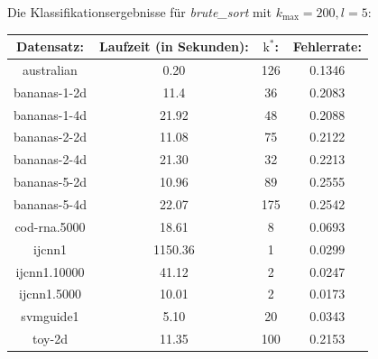 \documentclass[9pt]{beamer}
\begin{document}
\begin{frame}
Die Klassifikationsergebnisse für \textit{brute\_sort} mit $k_\text{max} = 200, l = 5$:
\begin{center}
\begin{tabular}{|c|c|c|c|}
\hline
\textbf{Datensatz:}& \textbf{Laufzeit (in Sekunden):} & \textbf{$\text{k}^*$:} & \textbf{Fehlerrate:}\\

\hline

australian & 0.20 & 126 & 0.1346\\

\hline

bananas-1-2d  &11.4 &36 &0.2083\\

\hline

bananas-1-4d  &21.92 &48 &0.2088\\

\hline

bananas-2-2d  &11.08 &75 &0.2122\\

\hline

bananas-2-4d  &21.30 &32 &0.2213\\

\hline

bananas-5-2d  &10.96 &89 &0.2555\\

\hline

bananas-5-4d  &22.07 &175 &0.2542\\

\hline

 cod-rna.5000 &18.61 &8 &0.0693\\

\hline

 ijcnn1 &1150.36 &1 &0.0299\\

\hline

ijcnn1.10000  &41.12 &2 &0.0247\\

\hline

ijcnn1.5000  &10.01 &2 &0.0173\\

\hline

svmguide1  &5.10 &20 &0.0343\\

\hline



toy-2d  &11.35 &100 &0.2153\\


\end{tabular}
\end{center}
\end{frame}
\end{document}
